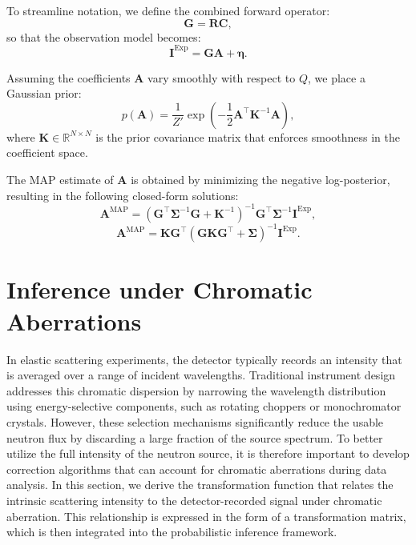 \documentclass[12pt]{article}
\begin{document}
To streamline notation, we define the combined forward operator:
\begin{equation}
    \mathbf{G} = \mathbf{R} \mathbf{C},
\end{equation}
so that the observation model becomes:
\begin{equation}
    \mathbf{I}^{\mathrm{Exp}} = \mathbf{G} \mathbf{A} + \boldsymbol{\eta}.
\end{equation}

Assuming the coefficients \( \mathbf{A} \) vary smoothly with respect to \( Q \), we place a Gaussian prior:
\begin{equation}
    p(\mathbf{A}) = \frac{1}{Z'} \exp\left( -\frac{1}{2} \mathbf{A}^\top \mathbf{K}^{-1} \mathbf{A} \right),
\end{equation}
where \( \mathbf{K} \in \mathbb{R}^{N \times N} \) is the prior covariance matrix that enforces smoothness in the coefficient space.

The MAP estimate of \( \mathbf{A} \) is obtained by minimizing the negative log-posterior, resulting in the following closed-form solutions:
\begin{equation}
    \mathbf{A}^{\mathrm{MAP}} = \left( \mathbf{G}^\top \boldsymbol{\Sigma}^{-1} \mathbf{G} + \mathbf{K}^{-1} \right)^{-1} \mathbf{G}^\top \boldsymbol{\Sigma}^{-1} \mathbf{I}^{\mathrm{Exp}},
\end{equation}
\begin{equation}
    \mathbf{A}^{\mathrm{MAP}} = \mathbf{K} \mathbf{G}^\top \left( \mathbf{G} \mathbf{K} \mathbf{G}^\top + \boldsymbol{\Sigma} \right)^{-1} \mathbf{I}^{\mathrm{Exp}}.
\end{equation}

\clearpage
\section{Inference under Chromatic Aberrations}
\label{sec:wavelength_scaling}

In elastic scattering experiments, the detector typically records an intensity that is averaged over a range of incident wavelengths. Traditional instrument design addresses this chromatic dispersion by narrowing the wavelength distribution using energy-selective components, such as rotating choppers or monochromator crystals. However, these selection mechanisms significantly reduce the usable neutron flux by discarding a large fraction of the source spectrum. To better utilize the full intensity of the neutron source, it is therefore important to develop correction algorithms that can account for chromatic aberrations during data analysis. 
In this section, we derive the transformation function that relates the intrinsic scattering intensity to the detector-recorded signal under chromatic aberration. This relationship is expressed in the form of a transformation matrix, which is then integrated into the probabilistic inference framework.
\end{document}
